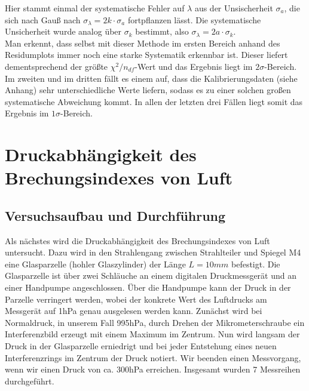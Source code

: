\documentclass[12pt,a4paper]{article}
\begin{document}
Hier stammt einmal der systematische Fehler auf $\lambda$ aus der Unsischerheit $\sigma_a$, die sich nach Gauß nach $\sigma_{\lambda} = 2k \cdot \sigma_a$ fortpflanzen lässt. Die systematische Unsicherheit wurde analog über $\sigma_k$ bestimmt, also $\sigma_{\lambda} = 2a\cdot \sigma_{k}$.\\
Man erkennt, dass selbst mit dieser Methode im ersten Bereich anhand des Residumplots immer noch eine starke Systematik erkennbar ist. Dieser liefert dementsprechend der größte $\chi^2/n_{df}$-Wert und das Ergebnis liegt im $2\sigma$-Bereich. Im zweiten und im dritten fällt es einem auf, dass die Kalibrierungsdaten (siehe Anhang) sehr unterschiedliche Werte liefern, sodass es zu einer solchen großen systematische Abweichung kommt. In allen der letzten drei Fällen liegt somit das Ergebnis im $1\sigma$-Bereich. 
\section{Druckabhängigkeit des Brechungsindexes von Luft}
\subsection{Versuchsaufbau und Durchführung}
Als nächstes wird die Druckabhängigkeit des Brechungsindexes von Luft untersucht. Dazu wird in den Strahlengang zwischen Strahlteiler und Spiegel M4 eine Glasparzelle (hohler Glaszylinder) der Länge $L=10mm$ befestigt. Die Glasparzelle ist über zwei Schläuche an einem digitalen Druckmessgerät und an einer Handpumpe angeschlossen. Über die Handpumpe kann der Druck in der Parzelle verringert werden, wobei der konkrete Wert des Luftdrucks am Messgerät auf 1hPa genau ausgelesen werden kann. Zunächst wird bei Normaldruck, in unserem Fall 995hPa, durch Drehen der Mikrometerschraube ein Interferenzbild erzeugt mit einem Maximum im Zentrum. Nun wird langsam der Druck in der Glasparzelle erniedrigt und bei jeder Entstehung eines neuen Interferenzrings im Zentrum der Druck notiert. Wir beenden einen Messvorgang, wenn wir einen Druck von ca. 300hPa erreichen. Insgesamt wurden 7 Messreihen durchgeführt.
\end{document}
